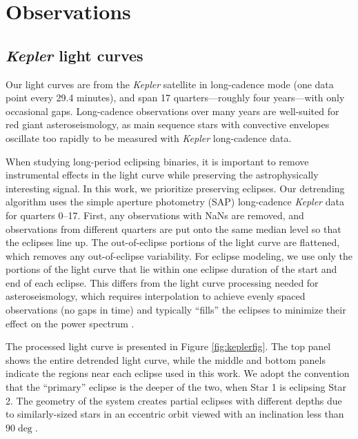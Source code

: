 \section{Observations}\label{data}

\subsection{\emph{Kepler} light curves}\label{kepler}
Our light curves are from the \emph{Kepler} satellite in long-cadence mode (one data point every 29.4 minutes), and span 17 quarters---roughly four years---with only occasional gaps. Long-cadence observations over many years are well-suited for red giant asteroseismology, as main sequence stars with convective envelopes oscillate too rapidly to be measured with \emph{Kepler} long-cadence data.

When studying long-period eclipsing binaries, it is important to remove instrumental effects in the light curve while preserving the astrophysically interesting signal. In this work, we prioritize preserving eclipses. Our detrending algorithm uses the simple aperture photometry (SAP) long-cadence \emph{Kepler} data for quarters 0--17. First, any observations with NaNs are removed, and observations from different quarters are put onto the same median level so that the eclipses line up. The out-of-eclipse portions of the light curve are flattened, which removes any out-of-eclipse variability. For eclipse modeling, we use only the portions of the light curve that lie within one eclipse duration of the start and end of each eclipse. This differs from the light curve processing needed for asteroseismology, which requires interpolation to achieve evenly spaced observations (no gaps in time) and typically ``fills'' the eclipses to minimize their effect on the power spectrum \citep{gau14}.

The processed light curve is presented in Figure \ref{fig:keplerfig}. The top panel shows the entire detrended light curve, while the middle and bottom panels indicate the regions near each eclipse used in this work. We adopt the convention that the ``primary'' eclipse is the deeper of the two, when Star 1 is eclipsing Star 2. The geometry of the system creates partial eclipses with different depths due to similarly-sized stars in an eccentric orbit viewed with an inclination less than $90 \deg$.
  
  
  
  